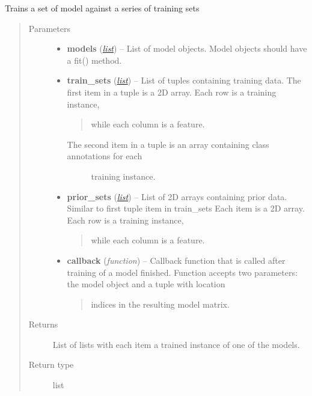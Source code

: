 \documentclass[letterpaper,10pt,english]{sphinxmanual}
\begin{document}
\begin{fulllineitems}
\label{classification:flamingo.classification.models.train_models}
Trains a set of model against a series of training sets
\begin{quote}\begin{description}
\item[{Parameters}] \leavevmode\begin{itemize}
\item {} 
\textbf{models} (\href{http://docs.python.org/library/functions.html\#list}{\emph{list}}) -- List of model objects. Model objects should have a fit() method.

\item {} 
\textbf{train\_sets} (\href{http://docs.python.org/library/functions.html\#list}{\emph{list}}) -- 
List of tuples containing training data.
The first item in a tuple is a 2D array. Each row is a training instance,
\begin{quote}

while each column is a feature.
\end{quote}
\begin{description}
\item[{The second item in a tuple is an array containing class annotations for each}] \leavevmode
training instance.

\end{description}


\item {} 
\textbf{prior\_sets} (\href{http://docs.python.org/library/functions.html\#list}{\emph{list}}) -- 
List of 2D arrays containing prior data.
Similar to first tuple item in train\_sets
Each item is a 2D array. Each row is a training instance,
\begin{quote}

while each column is a feature.
\end{quote}


\item {} 
\textbf{callback} (\emph{function}) -- 
Callback function that is called after training of a model finished.
Function accepts two parameters: the model object and a tuple with location
\begin{quote}

indices in the resulting model matrix.
\end{quote}


\end{itemize}

\item[{Returns}] \leavevmode
List of lists with each item a trained instance of one of the models.

\item[{Return type}] \leavevmode
list

\end{description}\end{quote}

\end{fulllineitems}
\end{document}
